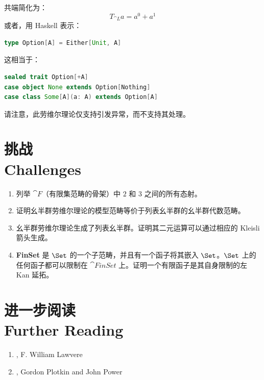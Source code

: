 共端简化为：
\[T_{\cat{L}} a = a^0 + a^1\]
或者，用 Haskell 表示：

\begin{lstlisting}[language=Scala]
type Option[A] = Either[Unit, A]
\end{lstlisting}
这相当于：

\begin{lstlisting}[language=Scala]
sealed trait Option[+A]
case object None extends Option[Nothing]
case class Some[A](a: A) extends Option[A]
\end{lstlisting}
请注意，此劳维尔理论仅支持引发异常，而不支持其处理。

\section{挑战\\ \textmd{Challenges}}

\begin{enumerate}
  \tightlist
  \item
  列举 $\cat{F}$（有限集范畴的骨架）中 $2$ 和 $3$ 之间的所有态射。
  \item
  证明幺半群劳维尔理论的模型范畴等价于列表幺半群的幺半群代数范畴。
  \item
  幺半群劳维尔理论生成了列表幺半群。证明其二元运算可以通过相应的 Kleisli 箭头生成。
  \item
  \textbf{FinSet} 是 $\Set$ 的一个子范畴，并且有一个函子将其嵌入 $\Set$。$\Set$ 上的任何函子都可以限制在 $\cat{FinSet}$ 上。证明一个有限函子是其自身限制的左 Kan 延拓。
\end{enumerate}

\section{进一步阅读\\ \textmd{Further Reading}}
\begin{enumerate}
  \tightlist
  \item
  , F. William Lawvere
  \item
  , Gordon Plotkin and John Power
\end{enumerate}

